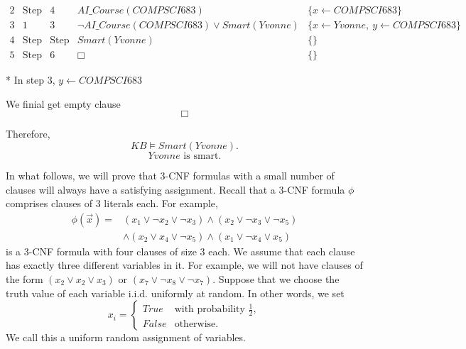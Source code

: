 \documentclass[10pt,a4paper]{exam}
\begin{document}
\begin{questions}
\[\begin{array}{c|c|c|c|c}
2 & \text{Step 1} & 4
& AI\_Course(COMPSCI683)
& \{x\leftarrow COMPSCI683\} \\

3 & 1 & 3
& \neg AI\_Course(COMPSCI683) \vee Smart(Yvonne)
& \{x\leftarrow Yvonne,\ y\leftarrow COMPSCI683\} \\

4 & \text{Step 3} & \text{Step 2}
& Smart(Yvonne)
& \{\} \\

5 & \text{Step 4} & 6
& \Box
& \{\}
\end{array}
\]

* In step 3, $y \leftarrow COMPSCI683$

We finial get empty clause
\[
\Box
\]

Therefore,
\[
KB \models Smart(Yvonne).
\]
\[
Yvonne \text{ is smart.}
\]





\newpage

\question[Bonus]
In what follows, we will prove that 3-CNF formulas with a small number of clauses will always have a satisfying assignment. Recall that a 3-CNF formula $\phi$ comprises clauses of 3 literals each. For example,
\begin{align*}
    \phi(\vec x) ={} & (x_1\vee \neg x_2 \vee \neg x_3) \wedge (x_2 \vee \neg x_3 \vee\neg x_5) \\
    & \wedge (x_2\vee x_4\vee \neg x_5) \wedge (x_1 \vee \neg x_4 \vee x_5)
\end{align*}
is a 3-CNF formula with four clauses of size 3 each. We assume that each clause has exactly three different variables in it. For example, we will not have clauses of the form $(x_2 \vee x_2 \vee x_3)$ or $(x_7\vee \neg x_8 \vee \neg x_7)$.
Suppose that we choose the truth value of each variable i.i.d. uniformly at random. In other words, we set
\[
x_i = \begin{cases}
    \mathit{True} & \text{with probability } \frac12,\\
    \mathit{False} & \text{otherwise.}
\end{cases}
\]
We call this a uniform random assignment of variables.

\end{questions}
\end{document}
